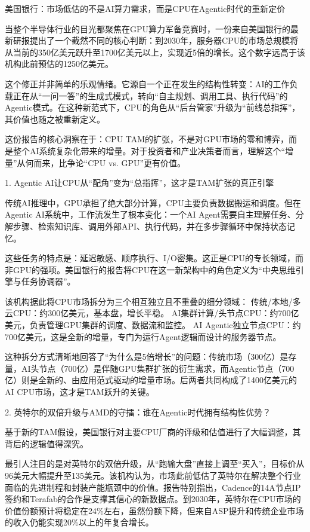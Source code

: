 \documentclass[11pt]{ctexart}
\begin{document}
美国银行：市场低估的不是AI算力需求，而是CPU在Agentic时代的重新定价

当整个半导体行业的目光都聚焦在GPU算力军备竞赛时，一份来自美国银行的最新研报提出了一个截然不同的核心判断：到2030年，服务器CPU的市场总规模将从当前的350亿美元跃升至1700亿美元以上，实现近5倍的增长。这个数字远高于该机构此前预估的1250亿美元。

这个修正并非简单的乐观情绪。它源自一个正在发生的结构性转变：AI的工作负载正在从“一问一答”的生成式模式，转向“自主规划、调用工具、执行代码”的Agentic模式。在这种新范式下，CPU的角色从“后台管家”升级为“前线总指挥”，其价值也随之被重新定义。

这份报告的核心洞察在于：CPU TAM的扩张，不是对GPU市场的零和博弈，而是整个AI系统复杂化带来的增量。对于投资者和产业决策者而言，理解这个“增量”从何而来，比争论“CPU vs. GPU”更有价值。

1. Agentic AI让CPU从“配角”变为“总指挥”，这才是TAM扩张的真正引擎

传统AI推理中，GPU承担了绝大部分计算，CPU主要负责数据搬运和调度。但在Agentic AI系统中，工作流发生了根本变化：一个AI Agent需要自主理解任务、分解步骤、检索知识库、调用外部API、执行代码，并在多步骤循环中保持状态记忆。

这些任务的特点是：延迟敏感、顺序执行、I/O密集。这正是CPU的专长领域，而非GPU的强项。美国银行的报告将CPU在这一新架构中的角色定义为“中央思维引擎与任务协调器”。

该机构据此将CPU市场拆分为三个相互独立且不重叠的细分领域： 传统/本地/多云CPU：约300亿美元，基本盘，增长平稳。 AI集群计算/头节点CPU：约700亿美元，负责管理GPU集群的调度、数据流和监控。 AI Agentic独立节点CPU：约700亿美元，这是全新的增量，专门为运行Agent逻辑而设计的服务器节点。

这种拆分方式清晰地回答了“为什么是5倍增长”的问题：传统市场（300亿）是存量，AI头节点（700亿）是伴随GPU集群扩张的衍生需求，而Agentic节点（700亿）则是全新的、由应用范式驱动的增量市场。后两者共同构成了1400亿美元的AI CPU市场，这才是TAM跃升的关键。

2. 英特尔的双倍升级与AMD的守擂：谁在Agentic时代拥有结构性优势？

基于新的TAM假设，美国银行对主要CPU厂商的评级和估值进行了大幅调整，其背后的逻辑值得深究。

最引人注目的是对英特尔的双倍升级，从“跑输大盘”直接上调至“买入”，目标价从96美元大幅提升至135美元。该机构认为，市场此前低估了英特尔在解决整个行业面临的先进制程和封装产能瓶颈中的价值。报告特别指出，Cadence的14A节点IP签约和Terafab的合作是支撑其信心的新数据点。到2030年，英特尔在CPU市场的价值份额预计将稳定在24\%左右，虽然份额下降，但来自ASP提升和传统企业市场的收入仍能实现20\%以上的年复合增长。
\end{document}
